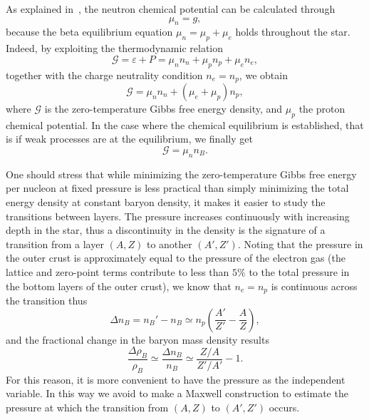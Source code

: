 As explained in~\cite{Pearson2018}, the neutron chemical potential can be
calculated through
%
\begin{equation}
  \mu_n = g,
\end{equation}
%
because the beta equilibrium equation $\mu_n = \mu_p + \mu_e$ holds throughout
the star.
Indeed, by exploiting the thermodynamic relation
%
\begin{equation}
  \mathcal{G} = \varepsilon + P = \mu_n n_n + \mu_p n_p + \mu_e n_e,
\end{equation}
%
together with the charge neutrality condition $n_e = n_p$, we obtain
%
\begin{equation}
  \mathcal{G} = \mu_n n_n + (\mu_e + \mu_p)n_p,
\end{equation}
%
where $\mathcal{G}$ is the zero-temperature Gibbs free energy density, and
$\mu_p$ the proton chemical potential. In the case where 
the chemical equilibrium is established, that is if weak processes are at the 
equilibrium, we finally get
%
\begin{equation}
  \mathcal{G} = \mu_n n_B.
\end{equation}

One should stress that while minimizing the zero-temperature Gibbs 
free energy per nucleon at fixed 
pressure is less practical than simply minimizing the total energy density at 
constant baryon density, it makes it easier to study the transitions between layers. 
The pressure increases continuously with increasing depth in the star, thus a 
discontinuity in the density is the signature of a transition from a layer 
$(A,Z)$ to another $(A',Z')$. Noting that the pressure in the outer crust is 
approximately equal to the pressure of the electron gas (the lattice and
zero-point terms contribute to less than $5\%$ to the total pressure in the
bottom layers of the outer crust), we know that $n_e = n_p$ is 
continuous across the transition thus
%
\begin{equation}
  \Delta n_B = n_B' - n_B \simeq n_p\left(\frac{A'}{Z'} - \frac{A}{Z}\right),
\end{equation}
%
and the fractional change in the baryon mass density results 
%
\begin{equation}
  \frac{\Delta \rho_B}{\rho_B} \simeq \frac{\Delta n_B}{n_B} 
  \simeq \frac{Z/A}{Z'/A'} - 1.
\end{equation}
%
For this reason, it is more convenient to have the pressure as the 
independent variable. In this way we avoid to make a Maxwell construction to 
estimate the pressure at which the transition from $(A,Z)$ to $(A',Z')$ occurs.

